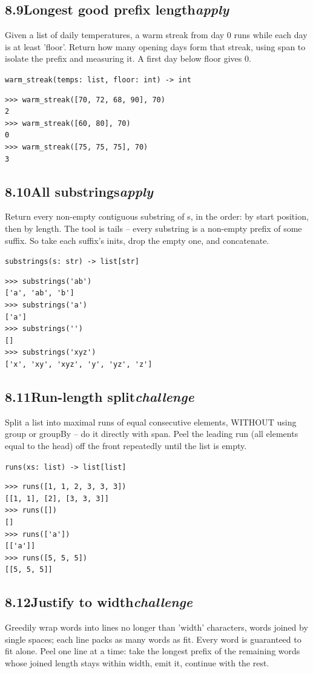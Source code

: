 \documentclass[10pt,letterpaper]{book}
\begin{document}
\subsection*{8.9\quad Longest good prefix length\hfill\textnormal{\textit{apply}}}
Given a list of daily temperatures, a warm streak from day 0 runs while each day is at least 'floor'. Return how many opening days form that streak, using span to isolate the prefix and measuring it. A first day below floor gives 0.

\noindent\texttt{warm\_streak(temps: list, floor: int) -> int}
\begin{lstlisting}[style=ex]
>>> warm_streak([70, 72, 68, 90], 70)
2
>>> warm_streak([60, 80], 70)
0
>>> warm_streak([75, 75, 75], 70)
3
\end{lstlisting}
\subsection*{8.10\quad All substrings\hfill\textnormal{\textit{apply}}}
Return every non-empty contiguous substring of s, in the order: by start position, then by length. The tool is tails -- every substring is a non-empty prefix of some suffix. So take each suffix's inits, drop the empty one, and concatenate.

\noindent\texttt{substrings(s: str) -> list[str]}
\begin{lstlisting}[style=ex]
>>> substrings('ab')
['a', 'ab', 'b']
>>> substrings('a')
['a']
>>> substrings('')
[]
>>> substrings('xyz')
['x', 'xy', 'xyz', 'y', 'yz', 'z']
\end{lstlisting}
\subsection*{8.11\quad Run-length split\hfill\textnormal{\textit{challenge}}}
Split a list into maximal runs of equal consecutive elements, WITHOUT using group or groupBy -- do it directly with span. Peel the leading run (all elements equal to the head) off the front repeatedly until the list is empty.

\noindent\texttt{runs(xs: list) -> list[list]}
\begin{lstlisting}[style=ex]
>>> runs([1, 1, 2, 3, 3, 3])
[[1, 1], [2], [3, 3, 3]]
>>> runs([])
[]
>>> runs(['a'])
[['a']]
>>> runs([5, 5, 5])
[[5, 5, 5]]
\end{lstlisting}
\subsection*{8.12\quad Justify to width\hfill\textnormal{\textit{challenge}}}
Greedily wrap words into lines no longer than 'width' characters, words joined by single spaces; each line packs as many words as fit. Every word is guaranteed to fit alone. Peel one line at a time: take the longest prefix of the remaining words whose joined length stays within width, emit it, continue with the rest.
\end{document}
